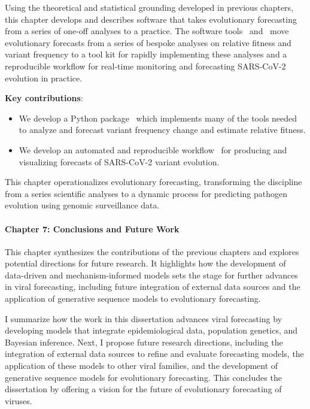 Using the theoretical and statistical grounding developed in previous chapters, this chapter develops and describes software that takes evolutionary forecasting from a series of one-off analyses to a practice.
The software tools \evofr\ and \forecastsNcov\ move evolutionary forecasts from a series of bespoke analyses on relative fitness and variant frequency to a tool kit for rapidly implementing these analyses and a reproducible workflow for real-time monitoring and forecasting SARS-CoV-2 evolution in practice.

\noindent\textbf{Key contributions}:
\begin{itemize}
  \item We develop a Python package \evofr\ which implements many of the tools needed to analyze and forecast variant frequency change and estimate relative fitness.
  \item We develop an automated and reproducible workflow \forecastsNcov\ for producing and visualizing forecasts of SARS-CoV-2 variant evolution.
\end{itemize}

This chapter operationalizes evolutionary forecasting, transforming the discipline from a series scientific analyses to a dynamic process for predicting pathogen evolution using genomic surveillance data.

\paragraph{Chapter 7: Conclusions and Future Work}

This chapter synthesizes the contributions of the previous chapters and explores potential directions for future research.
It highlights how the development of data-driven and mechanism-informed models sets the stage for further advances in viral forecasting, including future integration of external data sources and the application of generative sequence models to evolutionary forecasting.

I summarize how the work in this dissertation advances viral forecasting by developing models that integrate epidemiological data, population genetics, and Bayesian inference.
Next, I propose future research directions, including the integration of external data sources to refine and evaluate forecasting models, the application of these models to other viral families, and the development of generative sequence models for evolutionary forecasting.
This concludes the dissertation by offering a vision for the future of evolutionary forecasting of viruses.
